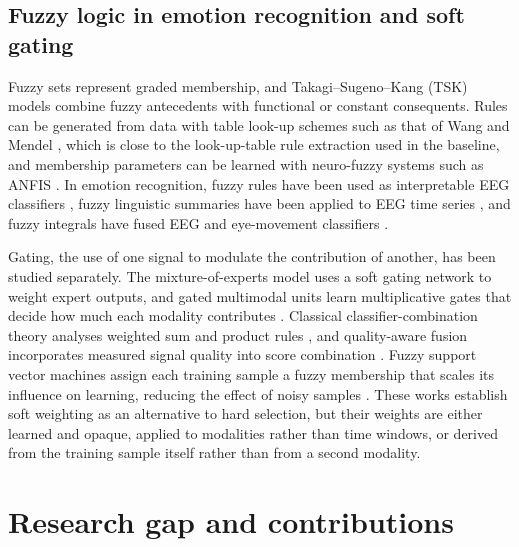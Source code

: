 \documentclass[11pt,a4paper]{article}
\begin{document}
\subsection{Fuzzy logic in emotion recognition and soft gating}
Fuzzy sets \cite{Zadeh1965} represent graded membership, and Takagi--Sugeno--Kang (TSK) models \cite{TakagiSugeno1985} combine fuzzy antecedents with functional or constant consequents. Rules can be generated from data with table look-up schemes such as that of Wang and Mendel \cite{WangMendel1992}, which is close to the look-up-table rule extraction used in the baseline, and membership parameters can be learned with neuro-fuzzy systems such as ANFIS \cite{Jang1993}. In emotion recognition, fuzzy rules have been used as interpretable EEG classifiers \cite{Matiko2014,FarhadiSedehi2024a}, fuzzy linguistic summaries have been applied to EEG time series \cite{Kaya2024}, and fuzzy integrals have fused EEG and eye-movement classifiers \cite{Lu2015,ChoKim1995}.

Gating, the use of one signal to modulate the contribution of another, has been studied separately. The mixture-of-experts model \cite{Jacobs1991} uses a soft gating network to weight expert outputs, and gated multimodal units learn multiplicative gates that decide how much each modality contributes \cite{Arevalo2020}. Classical classifier-combination theory analyses weighted sum and product rules \cite{Kittler1998}, and quality-aware fusion incorporates measured signal quality into score combination \cite{Nandakumar2008}. Fuzzy support vector machines assign each training sample a fuzzy membership that scales its influence on learning, reducing the effect of noisy samples \cite{LinWang2002}. These works establish soft weighting as an alternative to hard selection, but their weights are either learned and opaque, applied to modalities rather than time windows, or derived from the training sample itself rather than from a second modality.

\section{Research gap and contributions}
\label{sec:gap}
\end{document}
